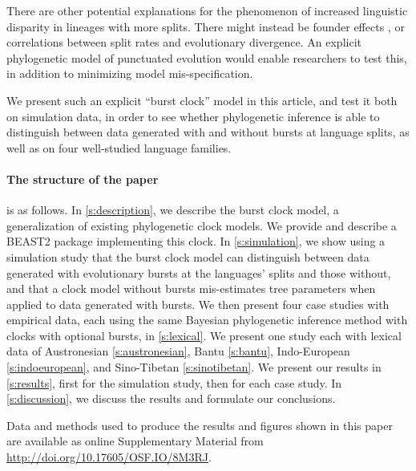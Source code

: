 \documentclass[]{rsos}%
\begin{document}
There are other potential explanations for the phenomenon of increased
linguistic disparity in lineages with more splits. There might instead be
founder effects \parencite{atkinson2008languages,greenhill2017evolutionary},
or correlations between split rates and evolutionary divergence.
An explicit phylogenetic model of punctuated evolution would enable
researchers to test this, in addition to minimizing model mis-specification.

We present such an explicit “burst clock” model in this article, and test it
both on simulation data, in order to see whether phylogenetic inference is able
to distinguish between data generated with and without bursts at language
splits, as well as on four well-studied language families.

\paragraph{The structure of the paper} is as follows. In \cref{s:description},
we describe the burst clock model, a generalization of existing phylogenetic
clock models. We provide and describe a BEAST2 \parencite{drummond2015bayesian}
package implementing this clock. In \cref{s:simulation}, we show using a
simulation study that the burst clock model can distinguish between data
generated with evolutionary bursts at the languages' splits and those without,
and that a clock model without bursts mis-estimates tree parameters when applied
to data generated with bursts. We then present four case studies with empirical
data, each using the same Bayesian phylogenetic inference method with clocks
with optional bursts, in \cref{s:lexical}. We present one study each with
lexical data of Austronesian \ref{s:austronesian}, Bantu \ref{s:bantu},
Indo-European \ref{s:indoeuropean}, and Sino-Tibetan \ref{s:sinotibetan}. We
present our results in \cref{s:results}, first for the simulation study, then
for each case study. In \cref{s:discussion}, we discuss the results and
formulate our conclusions.

Data and methods used to produce the results and figures shown in this paper are
available as online Supplementary Material from \url{http://doi.org/10.17605/OSF.IO/8M3RJ}.
\end{document}
